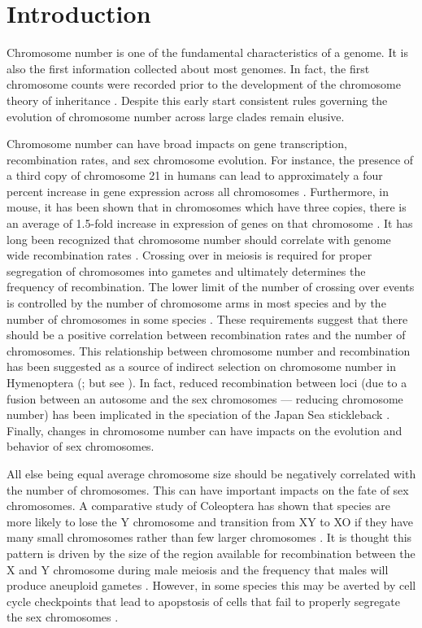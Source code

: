 \section{Introduction}
Chromosome number is one of the fundamental characteristics of a genome.
It is also the first information collected about most genomes. 
In fact, the first chromosome counts were recorded prior to the development of the chromosome theory of inheritance \citep{flemming1882}.
Despite this early start consistent rules governing the evolution of chromosome number across large clades remain elusive. 

Chromosome number can have broad impacts on gene transcription, recombination rates, and sex chromosome evolution. 
For instance, the presence of a third copy of chromosome 21 in humans can lead to approximately a four percent increase in gene expression across all chromosomes \citep{lockstone2007}.
Furthermore, in mouse, it has been shown that in chromosomes which have three copies, there is an average of 1.5-fold increase in expression of genes on that chromosome \citep{williams2008aneuploidy}. 
It has long been recognized that chromosome number should correlate with genome wide recombination rates \citep{stebbins1958}.
Crossing over in meiosis is required for proper segregation of chromosomes into gametes and ultimately determines the frequency of recombination.
The lower limit of the number of crossing over events is controlled by the number of chromosome arms in most species and by the number of chromosomes in some species \citep{dumont2017req}.
These requirements suggest that there should be a positive correlation between recombination rates and the number of chromosomes. 
This relationship between chromosome number and recombination has been suggested as a source of indirect selection on chromosome number in Hymenoptera (\citealt{sherman1979}; but see \citealt{ross2015}).
In fact, reduced recombination between loci (due to a fusion between an autosome and the sex chromosomes --- reducing chromosome number) has been implicated in the speciation of the Japan Sea stickleback \citep{kitano2012}. 
Finally, changes in chromosome number can have impacts on the evolution and behavior of sex chromosomes. 

All else being equal average chromosome size should be negatively correlated with the number of chromosomes.
This can have important impacts on the fate of sex chromosomes.
A comparative study of Coleoptera has shown that species are more likely to lose the Y chromosome and transition from XY to XO if they have many small chromosomes rather than few larger chromosomes \citep{blackmon2015bioessay}.
It is thought this pattern is driven by the size of the region available for recombination between the X and Y chromosome during male meiosis and the frequency that males will produce aneuploid gametes \citep{blackmon2014}.
However, in some species this may be averted by cell cycle checkpoints that lead to apopstosis of cells that fail to properly segregate the sex chromosomes \citep{dumont2017par}.

